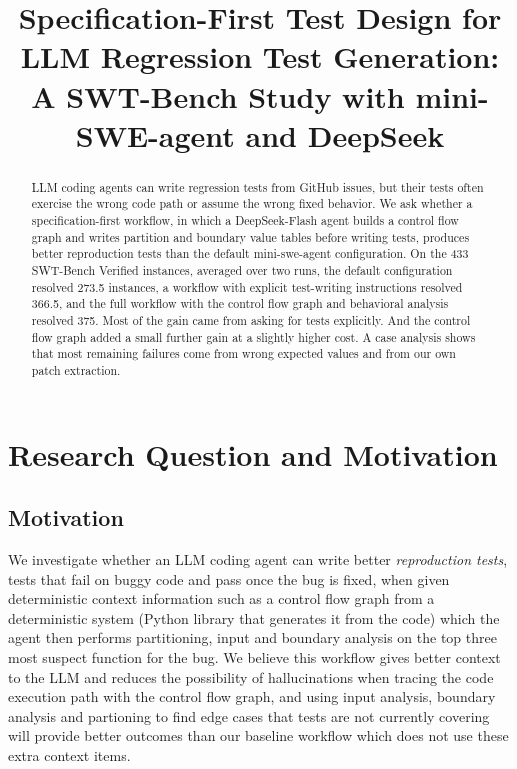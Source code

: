 \documentclass[conference]{IEEEtran}
\begin{document}
\title{Specification-First Test Design for LLM Regression Test Generation:\\
A SWT-Bench Study with mini-SWE-agent and DeepSeek}

\author{
\and
{}
}

\maketitle

\begin{abstract}
LLM coding agents can write regression tests from GitHub issues, but their tests often exercise the wrong code path or assume the wrong fixed behavior. We ask whether a specification-first workflow, in which a DeepSeek-Flash agent builds a control flow graph and writes partition and boundary value tables before writing tests, produces better reproduction tests than the default mini-swe-agent configuration. On the 433 SWT-Bench Verified instances, averaged over two runs, the default configuration resolved 273.5 instances, a workflow with explicit test-writing instructions resolved 366.5, and the full workflow with the control flow graph and behavioral analysis resolved 375. Most of the gain came from asking for tests explicitly. And the control flow graph added a small further gain at a slightly higher cost. A case analysis shows that most remaining failures come from wrong expected values and from our own patch extraction.
\end{abstract}

\section{Research Question and Motivation}
\label{sec:rq}

\subsection{Motivation}
We investigate whether an LLM coding agent can write better \emph{reproduction tests}, tests that fail on buggy code and pass once the bug is fixed, when given deterministic context information such as a control flow graph from a deterministic system (Python library that generates it from the code) which the agent then performs partitioning, input and boundary analysis on the top three most suspect function for the bug. We believe this workflow gives better context to the LLM and reduces the possibility of hallucinations when tracing the code execution path with the control flow graph, and using input analysis, boundary analysis and partioning to find edge cases that tests are not currently covering will provide better outcomes than our baseline workflow which does not use these extra context items.
\end{document}
